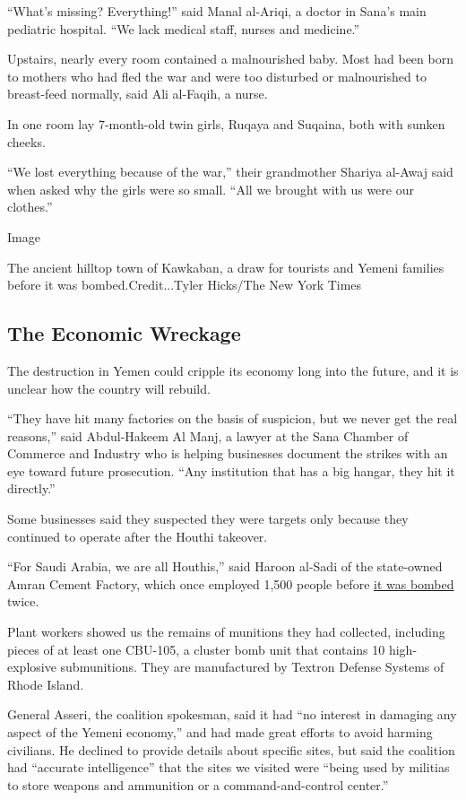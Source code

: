 ``What's missing? Everything!'' said Manal al-Ariqi, a doctor in Sana's
main pediatric hospital. ``We lack medical staff, nurses and medicine.''

Upstairs, nearly every room contained a malnourished baby. Most had been
born to mothers who had fled the war and were too disturbed or
malnourished to breast-feed normally, said Ali al-Faqih, a nurse.

In one room lay 7-month-old twin girls, Ruqaya and Suqaina, both with
sunken cheeks.

``We lost everything because of the war,'' their grandmother Shariya
al-Awaj said when asked why the girls were so small. ``All we brought
with us were our clothes.''

Image

The ancient hilltop town of Kawkaban, a draw for tourists and Yemeni
families before it was bombed.Credit...Tyler Hicks/The New York Times

\hypertarget{the-economic-wreckage}{%
\subsection{The Economic Wreckage}\label{the-economic-wreckage}}

The destruction in Yemen could cripple its economy long into the future,
and it is unclear how the country will rebuild.

``They have hit many factories on the basis of suspicion, but we never
get the real reasons,'' said Abdul-Hakeem Al Manj, a lawyer at the Sana
Chamber of Commerce and Industry who is helping businesses document the
strikes with an eye toward future prosecution. ``Any institution that
has a big hangar, they hit it directly.''

Some businesses said they suspected they were targets only because they
continued to operate after the Houthi takeover.

``For Saudi Arabia, we are all Houthis,'' said Haroon al-Sadi of the
state-owned Amran Cement Factory, which once employed 1,500 people
before
\href{http://www.nytimes3xbfgragh.onion/2016/02/04/world/middleeast/yemen-bombing-coalition-civilians.html}{it
was bombed} twice.

Plant workers showed us the remains of munitions they had collected,
including pieces of at least one CBU-105, a cluster bomb unit that
contains 10 high-explosive submunitions. They are manufactured by
Textron Defense Systems of Rhode Island.

General Asseri, the coalition spokesman, said it had ``no interest in
damaging any aspect of the Yemeni economy,'' and had made great efforts
to avoid harming civilians. He declined to provide details about
specific sites, but said the coalition had ``accurate intelligence''
that the sites we visited were ``being used by militias to store weapons
and ammunition or a command-and-control center.''

